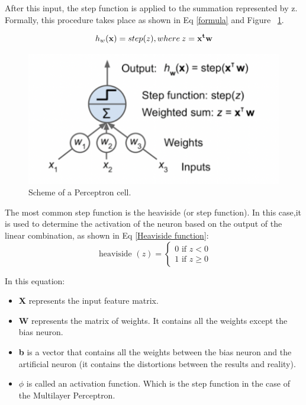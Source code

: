 After this input, the step function is applied to the summation represented by z. Formally, this procedure takes place as shown in Eq \eqref{formula} and Figure ~\ref{fig:summatory}.

\begin{equation} 
    h_{w}({\bf x}) = step(z), where \:z = {\bf x^{t} w}
    \label{formula}
\end{equation} 

\begin{figure} [h]
    \centering
   \includegraphics[width=\textwidth,height=\textheight,keepaspectratio]{Images/Theory_and_method/unnamed-2.png}
    \caption{Scheme of a Perceptron cell.}
    \label{fig:summatory}
\end{figure}

The most common step function is the heaviside (or step function). In this case,it is used to determine the activation of the neuron based on the output of the linear combination, as shown in Eq \eqref{Heaviside function}: 
\begin{equation} 
    \text { heaviside }(z)=\left\{\begin{array}{l}
    0 \text { if } z<0 \\
    1 \text { if } z \geq 0
    \end{array}\right.
    \label{Heaviside function}
\end{equation} 

In this equation:
\begin{itemize}
    \item \textbf{X} represents the input feature matrix.
    \item \textbf{W} represents the matrix of weights. It contains all the weights except the bias neuron.

    \item \textbf{b} is a vector that contains all the weights between the bias neuron and the artificial neuron (it contains the distortions between the results and reality).
    \item \textbf{$\phi$} is called an activation function. Which is the step function in the case of the Multilayer Perceptron.
\end{itemize}

